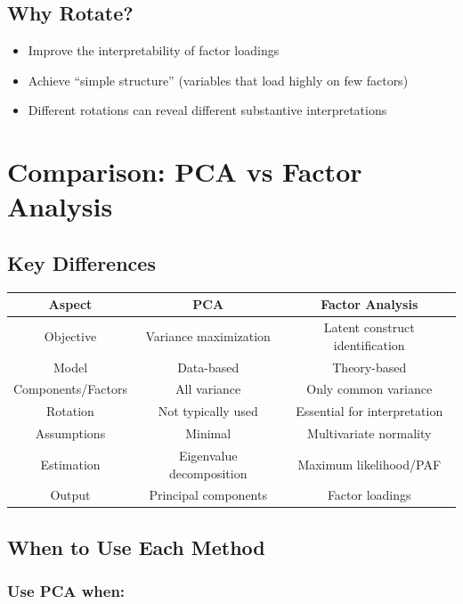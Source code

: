 \documentclass[
]{article}
\begin{document}
\subsection{Why Rotate?}

\begin{itemize}
\item
  Improve the interpretability of factor loadings
\item
  Achieve ``simple structure'' (variables that load highly on few
  factors)
\item
  Different rotations can reveal different substantive interpretations
\end{itemize}

\section{Comparison: PCA vs Factor Analysis}

\subsection{Key Differences}

{\def\LTcaptype{none} %
\begin{longtable}[]{@{}ccc@{}}
\toprule\noalign{}
\textbf{Aspect} & \textbf{PCA} & \textbf{Factor Analysis} \\
\midrule\noalign{}
\endhead
\bottomrule\noalign{}
\endlastfoot
Objective & Variance maximization & Latent construct identification \\
Model & Data-based & Theory-based \\
Components/Factors & All variance & Only common variance \\
Rotation & Not typically used & Essential for interpretation \\
Assumptions & Minimal & Multivariate normality \\
Estimation & Eigenvalue decomposition & Maximum likelihood/PAF \\
Output & Principal components & Factor loadings \\
\end{longtable}
}

\subsection{When to Use Each Method}

\subsubsection{Use PCA when:}
\end{document}
